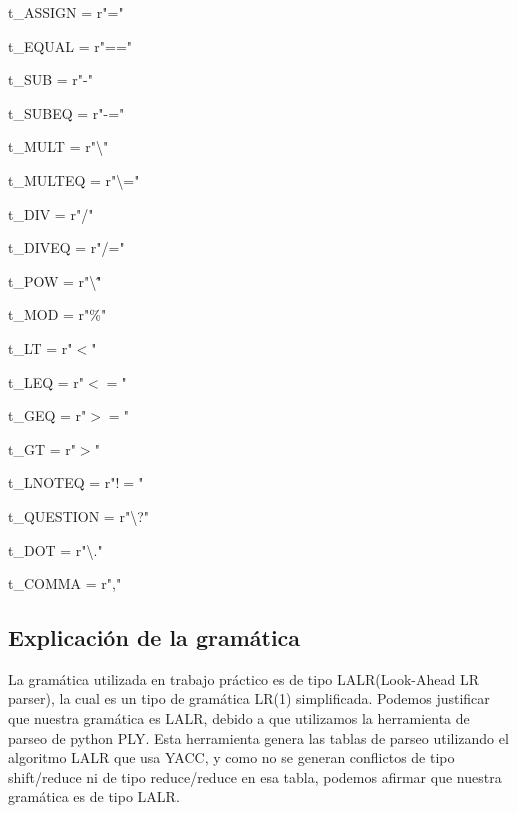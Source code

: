 t\_ASSIGN = r"="
                        
t\_EQUAL = r"=="
                          
t\_SUB = r"-"
                           
t\_SUBEQ = r"-="
                               
t\_MULT = r"\textbackslash*"
                                 
t\_MULTEQ = r"\textbackslash*="
                                   
t\_DIV = r"/"
                                     
t\_DIVEQ = r"/="
                                       
t\_POW = r"\textbackslash \^"
                                         
t\_MOD = r"\%"
                                           
t\_LT = r"$<$"
                                            
t\_LEQ = r"$<=$"
                                               
t\_GEQ = r"$>=$"
                                                 
t\_GT = r"$>$"
                                                   
t\_LNOTEQ = r"$!=$"
                                                     
t\_QUESTION = r"\textbackslash?"
                                                      
t\_DOT = r"\textbackslash."
                                                         
t\_COMMA = r","

\subsection{Explicación de la gramática}
La gramática utilizada en trabajo práctico es de tipo LALR(Look-Ahead LR
parser), la cual es un tipo de gramática LR(1) simplificada. Podemos justificar
que nuestra gramática es LALR, debido a que utilizamos la herramienta de
parseo de python PLY. Esta herramienta genera las tablas de parseo utilizando
el algoritmo LALR que usa YACC, y como no se generan conflictos de tipo
shift/reduce ni de tipo reduce/reduce en esa tabla, podemos afirmar que nuestra
gramática es de tipo LALR.

